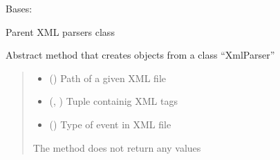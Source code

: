 \documentclass[letterpaper,10pt,english]{sphinxmanual}
\begin{document}
\begin{fulllineitems}
\label{\detokenize{xml_parsers:xml_parsers.XmlParser}}
\pysigstartsignatures
{}
\pysigstopsignatures
\sphinxAtStartPar
Bases: 

\sphinxAtStartPar
Parent XML parsers class

\begin{fulllineitems}
\label{\detokenize{xml_parsers:xml_parsers.XmlParser.__init__}}
\pysigstartsignatures
{}
\pysigstopsignatures
\sphinxAtStartPar
Abstract method that creates objects from a class “XmlParser”
\begin{quote}\begin{description}
\begin{itemize}
\item {} 
\sphinxAtStartPar
{} () \textendash{} Path of a given XML file

\item {} 
\sphinxAtStartPar
{} (\sphinxcode{\sphinxupquote{Tuple}}{[}, \sphinxcode{\sphinxupquote{...}}{]}) \textendash{} Tuple containig XML tags

\item {} 
\sphinxAtStartPar
{} () \textendash{} Type of event in XML file

\end{itemize}

\sphinxAtStartPar
The method does not return any values

\end{description}\end{quote}

\end{fulllineitems}


\end{fulllineitems}
\end{document}
